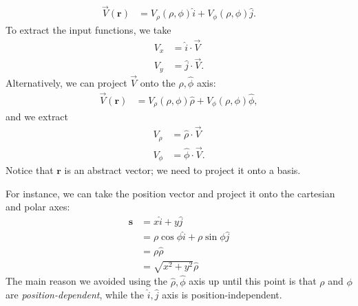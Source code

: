 \documentclass[10pt]{mypackage}
\begin{document}
\begin{align*}
  \vec{V}(\mathbf{r}) &= V_{\rho}\left(\rho,\phi\right)\hat{i} + V_{\phi}\left(\rho,\phi\right)\hat{j}.
\end{align*}
To extract the input functions, we take
\begin{align*}
  V_x &= \hat{i}\cdot \vec{V}\\
  V_y &= \hat{j}\cdot \vec{V}.
\end{align*}
Alternatively, we can project $ \vec{V} $ onto the $\hat\rho,\hat\phi$ axis:
\begin{align*}
  \vec{V}(\mathbf{r}) &= V_{\rho}\left(\rho,\phi\right)\hat{\rho} + V_{\phi}\left(\rho,\phi\right)\hat{\phi},
\end{align*}
and we extract
\begin{align*}
  V_{\rho} &= \hat{\rho}\cdot \vec{V}\\
  V_{\phi} &= \hat{\phi}\cdot \vec{V}.
\end{align*}
Notice that $\mathbf{r}$ is an abstract vector; we need to project it onto a basis.\newline

For instance, we can take the position vector and project it onto the cartesian and polar axes:
\begin{align*}
  \mathbf{s} &= x\hat{i} + y\hat{j}\\
             &= \rho \cos \phi \hat{i} + \rho \sin \phi \hat{j}\\
             &= \rho \hat{\rho}\\
             &= \sqrt{x^2 + y^2}\hat{\rho}
\end{align*}
The main reason we avoided using the $\hat\rho,\hat\phi$ axis up until this point is that $\rho$ and $\phi$ are \textit{position-dependent}, while the $\hat{i},\hat{j}$ axis is position-independent.\newline
\end{document}
